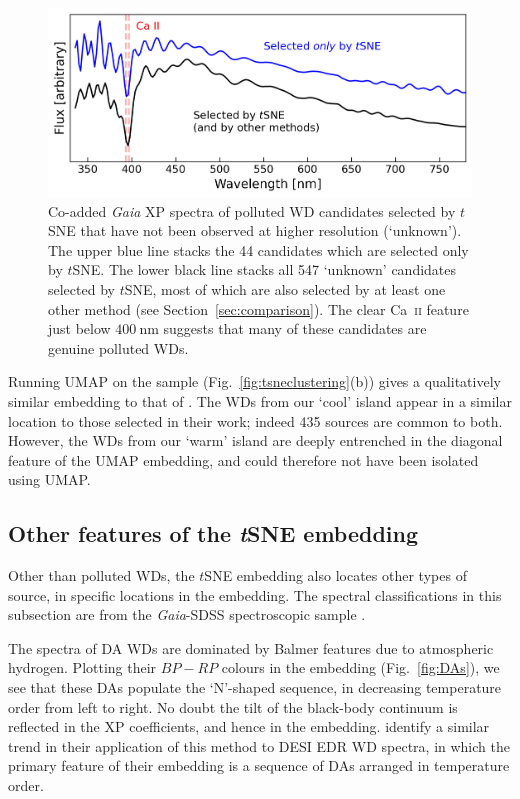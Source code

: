 \documentclass[fleqn,usenatbib]{rasti}
\begin{document}
\begin{figure}
\centering
\includegraphics[width=\textwidth]{figures/fig3_coaddedspectrum.png}
\caption{
    Co-added \textit{Gaia} XP spectra of polluted WD candidates selected by $t$SNE that have not been observed at higher resolution (`unknown').
    The upper blue line stacks the 44 candidates which are selected only by $t$SNE.
    The lower black line stacks all 547 `unknown' candidates selected by $t$SNE, most of which are also selected by at least one other method (see Section~\ref{sec:comparison}).
    The clear Ca~\textsc{ii} feature just below $400~\text{nm}$ suggests that many of these candidates are genuine polluted WDs.
}
\label{fig:coaddedspectrum}
\end{figure}

Running UMAP on the sample (Fig.~\ref{fig:tsneclustering}(b)) gives a qualitatively similar embedding to that of \citet[cf.\ their fig.~2]{kao24}.
The WDs from our `cool' island appear in a similar location to those selected in their work; indeed 435 sources are common to both.
However, the WDs from our `warm' island are deeply entrenched in the diagonal feature of the UMAP embedding, and could therefore not have been isolated using UMAP.


\subsection{Other features of the \textit{t}SNE embedding}

Other than polluted WDs, the $t$SNE embedding also locates other types of source, in specific locations in the embedding.
The spectral classifications in this subsection are from the \textit{Gaia}-SDSS spectroscopic sample \citep{gentilefusillo21}.

The spectra of DA WDs are dominated by Balmer features due to atmospheric hydrogen.
Plotting their $\mathit{BP}-\mathit{RP}$ colours in the embedding (Fig.~\ref{fig:DAs}), we see that these DAs populate the `N'-shaped sequence, in decreasing temperature order from left to right.
No doubt the tilt of the black-body continuum is reflected in the XP coefficients, and hence in the embedding.
\citet{byrne24c} identify a similar trend in their application of this method to DESI EDR WD spectra, in which the primary feature of their embedding is a sequence of DAs arranged in temperature order.
\end{document}
